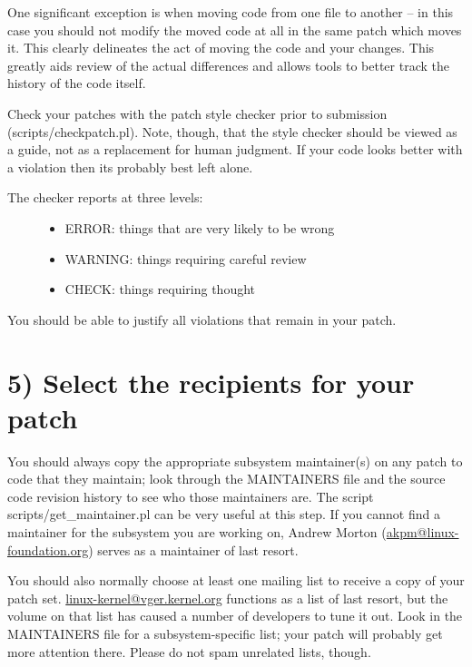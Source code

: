 \documentclass[a4paper,8pt,english]{sphinxmanual}
\begin{document}
One significant exception is when moving code from one file to
another -- in this case you should not modify the moved code at all in
the same patch which moves it.  This clearly delineates the act of
moving the code and your changes.  This greatly aids review of the
actual differences and allows tools to better track the history of
the code itself.

Check your patches with the patch style checker prior to submission
(scripts/checkpatch.pl).  Note, though, that the style checker should be
viewed as a guide, not as a replacement for human judgment.  If your code
looks better with a violation then its probably best left alone.
\begin{description}
\item[{The checker reports at three levels:}] \leavevmode\begin{itemize}
\item {} 
ERROR: things that are very likely to be wrong

\item {} 
WARNING: things requiring careful review

\item {} 
CHECK: things requiring thought

\end{itemize}

\end{description}

You should be able to justify all violations that remain in your
patch.


\section{5) Select the recipients for your patch}
\label{process/submitting-patches:select-the-recipients-for-your-patch}
You should always copy the appropriate subsystem maintainer(s) on any patch
to code that they maintain; look through the MAINTAINERS file and the
source code revision history to see who those maintainers are.  The
script scripts/get\_maintainer.pl can be very useful at this step.  If you
cannot find a maintainer for the subsystem you are working on, Andrew
Morton (\href{mailto:akpm@linux-foundation.org}{akpm@linux-foundation.org}) serves as a maintainer of last resort.

You should also normally choose at least one mailing list to receive a copy
of your patch set.  \href{mailto:linux-kernel@vger.kernel.org}{linux-kernel@vger.kernel.org} functions as a list of
last resort, but the volume on that list has caused a number of developers
to tune it out.  Look in the MAINTAINERS file for a subsystem-specific
list; your patch will probably get more attention there.  Please do not
spam unrelated lists, though.
\end{document}
